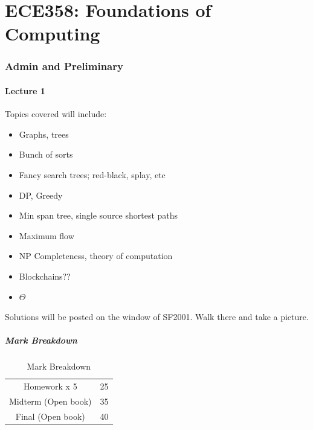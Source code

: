 \documentclass[10pt]{article}
\begin{document}







\part{ECE358: Foundations of Computing}


\section{Admin and Preliminary}

\subsection{Lecture 1}

Topics covered will include:
\begin{itemize}
	\item Graphs, trees
	\item Bunch of sorts
	\item Fancy search trees; red-black, splay, etc
	\item DP, Greedy
	\item Min span tree, single source shortest paths
	\item Maximum flow
	\item NP Completeness, theory of computation
	\item Blockchains??
	\item $ \Theta $ 
\end{itemize}

Solutions will be posted on the window of SF2001. Walk there and take a picture.

\subsubsection{Mark Breakdown}

\begin{table}[H]
	\centering
	\caption{Mark Breakdown}
	\begin{tabular}{|c|c|}
		\hline
		Homework x 5 & 25 \\
		Midterm (Open book) & 35 \\
		Final (Open book) & 40\\
		\hline
	\end{tabular}
\end{table}
\end{document}
